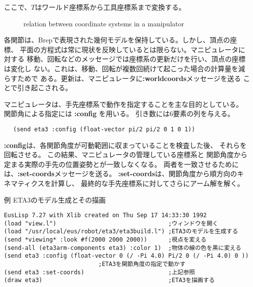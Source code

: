 ここで、$T$はワールド座標系から工具座標系まで変換する。

\begin{figure}
\begin{center}
\end{center}
\caption{\label{JointCoords}
relation between coordinate systems in a manipulator}

\end{figure}


各関節は、Brepで表現された幾何モデルを保持している。しかし、頂点の座標、
平面の方程式は常に現状を反映しているとは限らない。マニピュレータに対する
移動、回転などのメッセージでは座標系の更新だけを行い、頂点の座標は変化し
ない。これは、移動、回転が複数回続けて起こった場合の計算量を減らすためで
ある。更新は、マニピュレータに{\bf :worldcoords}メッセージを送る
ことで引き起こされる。


マニピュレータは、手先座標系で動作を指定することを主な目的としている。
関節角による指定には {\bf :config} を用いる。
引き数には6要素の列を与える。

\begin{verbatim}
　 (send eta3 :config (float-vector pi/2 pi/2 0 1 0 1))
\end{verbatim}

{\bf :config}は、各関節角度が可動範囲に収まっていることを検査した後、
それらを回転させる。
この結果、マニピュレータの管理している座標系と
関節角度から定まる実際の手先の位置姿勢とが一致しなくなる。
両者を一致させるためには、{\bf :set-coords}メッセージを送る。
{\bf :set-coords}は、関節角度から順方向のキネマティクスを計算し、
最終的な手先座標系に対してさらにアーム解を解く。


例 ETA3のモデル生成とその描画
\begin{verbatim}
EusLisp 7.27 with Xlib created on Thu Sep 17 14:33:30 1992
(load "view.l")                                ;ウィンドウを開く
(load "/usr/local/eus/robot/eta3/eta3build.l") ;ETA3のモデルを生成する
(send *viewing* :look #f(2000 2000 2000))      ;視点を変える
(send-all (eta3arm-components eta3) :color 1)  ;物体の線の色を黒に変える
(send eta3 :config (float-vector 0 (/ -Pi 4.0) Pi/2 0 (/ -Pi 4.0) 0 ))
					       ;ETA3を関節角度の指定で動かす
(send eta3 :set-coords)                        ;上記参照
(draw eta3)                                    ;ETA3を描画する
\end{verbatim}

\newpage
